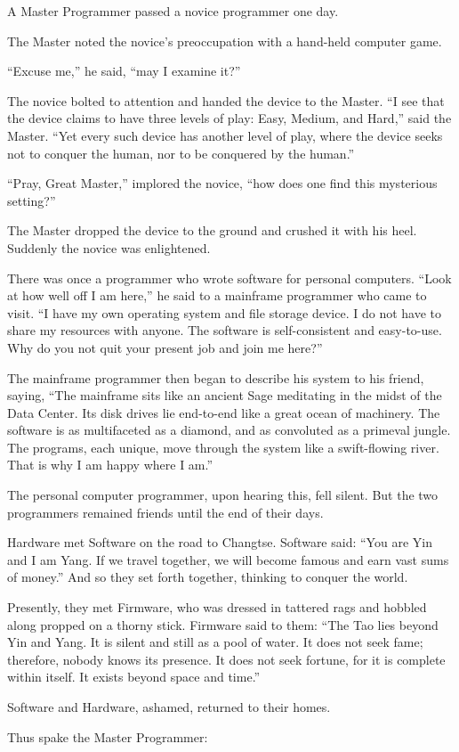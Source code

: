 A Master Programmer passed a novice programmer one day.

The Master noted the novice's preoccupation with a hand-held computer game.

``Excuse me,'' he said, ``may I examine it?''

The novice bolted to attention and handed the device to the Master. ``I see that the device claims to have three levels of play: Easy, Medium, and Hard,'' said the Master. ``Yet every such device has another level of play, where the device seeks not to conquer the human, nor to be conquered by the human.''

``Pray, Great Master,'' implored the novice, ``how does one find this mysterious setting?''

The Master dropped the device to the ground and crushed it with his heel. Suddenly the novice was enlightened.

There was once a programmer who wrote software for personal computers. ``Look at how well off I am here,'' he said to a mainframe programmer who came to visit. ``I have my own operating system and file storage device. I do not have to share my resources with anyone. The software is self-consistent and easy-to-use. Why do you not quit your present job and join me here?''

The mainframe programmer then began to describe his system to his friend, saying, ``The mainframe sits like an ancient Sage meditating in the midst of the Data Center. Its disk drives lie end-to-end like a great ocean of machinery. The software is as multifaceted as a diamond, and as convoluted as a primeval jungle. The programs, each unique, move through the system like a swift-flowing river. That is why I am happy where I am.''

The personal computer programmer, upon hearing this, fell silent. But the two programmers remained friends until the end of their days.

Hardware met Software on the road to Changtse. Software said: ``You are Yin and I am Yang. If we travel together, we will become famous and earn vast sums of money.'' And so they set forth together, thinking to conquer the world.

Presently, they met Firmware, who was dressed in tattered rags and hobbled along propped on a thorny stick. Firmware said to them: ``The Tao lies beyond Yin and Yang. It is silent and still as a pool of water. It does not seek fame; therefore, nobody knows its presence. It does not seek fortune, for it is complete within itself. It exists beyond space and time.''

Software and Hardware, ashamed, returned to their homes.

Thus spake the Master Programmer:

\bye

